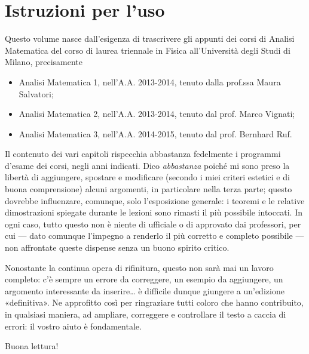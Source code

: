 \chapter{Istruzioni per l'uso}
Questo volume nasce dall'esigenza di trascrivere gli appunti dei corsi di Analisi Matematica del corso di laurea triennale in Fisica all'Università degli Studi di Milano, precisamente
\begin{itemize}
\item Analisi Matematica 1, nell'A.A. 2013-2014, tenuto dalla prof.ssa Maura Salvatori;
\item Analisi Matematica 2, nell'A.A. 2013-2014, tenuto dal prof. Marco Vignati;
\item Analisi Matematica 3, nell'A.A. 2014-2015, tenuto dal prof. Bernhard Ruf.
\end{itemize}
Il contenuto dei vari capitoli rispecchia abbastanza fedelmente i programmi d'esame dei corsi, negli anni indicati.
Dico \emph{abbastanza} poich\'e mi sono preso la libertà di aggiungere, spostare e modificare (secondo i miei criteri estetici e di buona comprensione) alcuni argomenti, in particolare nella terza parte; questo dovrebbe influenzare, comunque, solo l'esposizione generale: i teoremi e le relative dimostrazioni spiegate durante le lezioni sono rimasti il più possibile intoccati.
In ogni caso, tutto questo non è niente di ufficiale o di approvato dai professori, per cui --- dato comunque l'impegno a renderlo il più corretto e completo possibile --- non affrontate queste dispense senza un buono spirito critico.

Nonostante la continua opera di rifinitura, questo non sarà mai un lavoro completo: c'è sempre un errore da correggere, un esempio da aggiungere, un argomento interessante da inserire\ldots{} è difficile dunque giungere a un'edizione «definitiva».
Ne approfitto cos\`i per ringraziare tutti coloro che hanno contribuito, in qualsiasi maniera, ad ampliare, correggere e controllare il testo a caccia di errori: il vostro aiuto è fondamentale.

Buona lettura!

